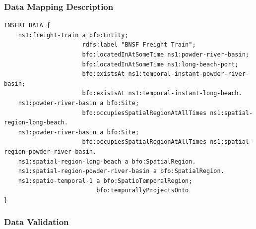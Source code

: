 \subsubsection*{Data Mapping Description}

\begin{verbatim}
INSERT DATA {
    ns1:freight-train a bfo:Entity;
                      rdfs:label "BNSF Freight Train";   
                      bfo:locatedInAtSomeTime ns1:powder-river-basin;
                      bfo:locatedInAtSomeTime ns1:long-beach-port;
                      bfo:existsAt ns1:temporal-instant-powder-river-basin;
                      bfo:existsAt ns1:temporal-instant-long-beach.
    ns1:powder-river-basin a bfo:Site; 
                      bfo:occupiesSpatialRegionAtAllTimes ns1:spatial-region-long-beach.
    ns1:powder-river-basin a bfo:Site; 
                      bfo:occupiesSpatialRegionAtAllTimes ns1:spatial-region-powder-river-basin.
    ns1:spatial-region-long-beach a bfo:SpatialRegion.
    ns1:spatial-region-powder-river-basin a bfo:SpatialRegion.
    ns1:spatio-temporal-1 a bfo:SpatioTemporalRegion;
                          bfo:temporallyProjectsOnto 
}
\end{verbatim}

\subsubsection*{Data Validation}